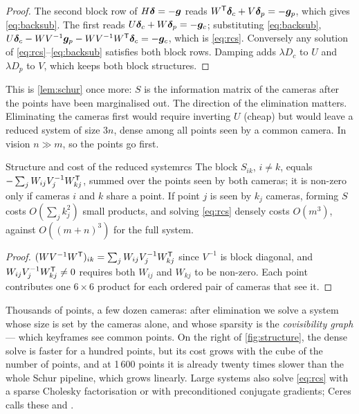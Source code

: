 \begin{proof}
The second block row of $H\bm{\delta}=-\bm{g}$ reads $W^{\mathsf{T}}\bm{\delta}_c
+V\bm{\delta}_p=-\bm{g}_p$, which gives \eqref{eq:backsub}. The first
reads $U\bm{\delta}_c+W\bm{\delta}_p=-\bm{g}_c$; substituting
\eqref{eq:backsub}, $U\bm{\delta}_c-WV^{-1}\bm{g}_p-WV^{-1}W^{\mathsf{T}}
\bm{\delta}_c=-\bm{g}_c$, which is \eqref{eq:rcs}. Conversely any
solution of \eqref{eq:rcs}--\eqref{eq:backsub} satisfies both block rows.
Damping adds $\lambda D_c$ to $U$ and $\lambda D_p$ to $V$, which keeps
both block structures.
\end{proof}

This is \cref{lem:schur} once more: $S$ is the information matrix of the
cameras after the points have been marginalised out. The direction of
the elimination matters. Eliminating the cameras first would require
inverting $U$ (cheap) but would leave a reduced system of size $3n$,
dense among all points seen by a common camera. In vision $n\gg m$, so
the points go first.

\begin{proposition}{Structure and cost of the reduced system}{rcs}
The block $S_{ik}$, $i\neq k$, equals $-\sum_jW_{ij}V_j^{-1}W_{kj}^{\mathsf{T}}$,
summed over the points seen by both cameras; it is non-zero only if
cameras $i$ and $k$ share a point. If point $j$ is seen by $k_j$
cameras, forming $S$ costs $O(\sum_jk_j^2)$ small products, and solving
\eqref{eq:rcs} densely costs $O(m^3)$, against $O((m+n)^3)$ for the full
system.
\end{proposition}

\begin{proof}
$(WV^{-1}W^{\mathsf{T}})_{ik}=\sum_jW_{ij}V_j^{-1}W_{kj}^{\mathsf{T}}$ since $V^{-1}$ is block
diagonal, and $W_{ij}V_j^{-1}W_{kj}^{\mathsf{T}}\neq0$ requires both $W_{ij}$ and
$W_{kj}$ to be non-zero. Each point contributes one $6\times6$ product
for each ordered pair of cameras that see it.
\end{proof}

\begin{inwords}
Thousands of points, a few dozen cameras: after elimination we solve a
system whose size is set by the cameras alone, and whose sparsity is the
\emph{covisibility graph} --- which keyframes see common points. On the
right of \cref{fig:structure}, the dense solve is faster for a hundred
points, but its cost grows with the cube of the number of points, and at
1\,600 points it is already twenty times slower than the whole Schur
pipeline, which grows linearly. Large systems also solve
\eqref{eq:rcs} with a sparse Cholesky factorisation or with
preconditioned conjugate gradients; Ceres calls these
 and .
\end{inwords}

